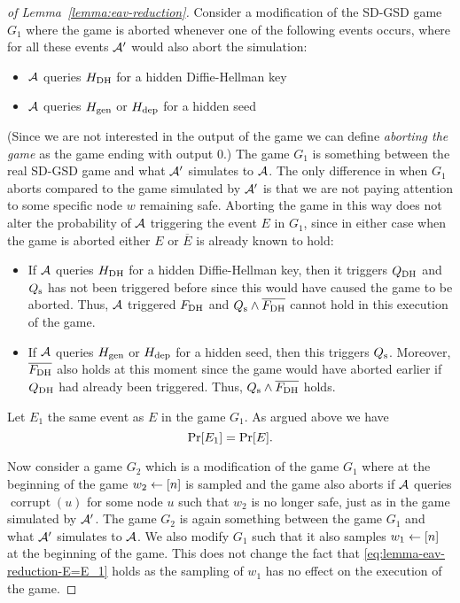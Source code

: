 \begin{proof}[of Lemma~\ref{lemma:eav-reduction}]
	Consider a modification of the SD-GSD game $G_1$ where the game is aborted whenever one of the following events occurs, where for all these events $\mathcal{A}'$ would also abort the simulation:
	\begin{itemize}
		\item $\mathcal{A}$ queries $H_\mathrm{DH}$ for a hidden Diffie-Hellman key
		\item $\mathcal{A}$ queries $H_\mathrm{gen}$ or $H_\mathrm{dep}$ for a hidden seed
	\end{itemize}
	(Since we are not interested in the output of the game we can define \emph{aborting the game} as the game ending with output 0.) The game $G_1$ is something between the real SD-GSD game and what $\mathcal{A}'$ simulates to $\mathcal{A}$. The only difference in when $G_1$ aborts compared to the game simulated by $\mathcal{A}'$ is that we are not paying attention to some specific node $w$ remaining safe. Aborting the game in this way does not alter the probability of $\mathcal{A}$ triggering the event $E$ in $G_1$, since in either case when the game is aborted either $E$ or $\overline{E}$ is already known to hold:
	\begin{itemize}
		\item If $\mathcal{A}$ queries $H_\mathrm{DH}$ for a hidden Diffie-Hellman key, then it triggers $Q_\mathrm{DH}$ and $Q_\mathrm{s}$ has not been triggered before since this would have caused the game to be aborted. Thus, $\mathcal{A}$ triggered $F_\mathrm{DH}$ and $Q_\mathrm{s} \land \overline{F_\mathrm{DH}}$ cannot hold in this execution of the game.
		\item If $\mathcal{A}$ queries $H_\mathrm{gen}$ or $H_\mathrm{dep}$ for a hidden seed, then this triggers $Q_\mathrm{s}$. Moreover, $\overline{F_\mathrm{DH}}$ also holds at this moment since the game would have aborted earlier if $Q_\mathrm{DH}$ had already been triggered. Thus, $Q_\mathrm{s} \land \overline{F_\mathrm{DH}}$ holds.
	\end{itemize}
	Let $E_1$ the same event as $E$ in the game $G_1$. As argued above we have
	\begin{equation} \label{eq:lemma-eav-reduction-E=E_1}
		\pr{E_1} = \pr{E}.
	\end{equation}


	Now consider a game $G_2$ which is a modification of the game $G_1$ where at the beginning of the game $w_2 \leftarrow [n]$ is sampled and the game also aborts if $\mathcal{A}$ queries $\operatorname{corrupt}(u)$ for some node $u$ such that $w_2$ is no longer safe, just as in the game simulated by $\mathcal{A}'$. The game $G_2$ is again something between the game $G_1$ and what $\mathcal{A}'$ simulates to $\mathcal{A}$. We also modify $G_1$ such that it also samples $w_1 \leftarrow [n]$ at the beginning of the game. This does not change the fact that \eqref{eq:lemma-eav-reduction-E=E_1} holds as the sampling of $w_1$ has no effect on the execution of the game.


\end{proof}
